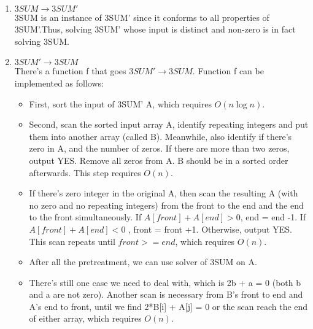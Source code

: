 \begin{problem}{1} ~
\begin{enumerate}
\item $3SUM \rightarrow 3SUM'$\\
3SUM is an instance of 3SUM' since it conforms to all properties of 3SUM'.Thus, solving 3SUM' whose input is distinct and non-zero is in fact solving 3SUM.\\

\item $3SUM' \rightarrow 3SUM$\\
There's a function f that goes $3SUM' \rightarrow 3SUM$. Function f can be implemented as follows:
\begin{itemize}
\item First, sort the input of 3SUM' A, which requires $O(n\log{}n)$.

\item Second, scan the sorted input array A, identify repeating integers and put them into another array (called B). Meanwhile, also identify if there's zero in A, and the number of zeros. If there are more than two zeros, output YES. Remove all zeros from A. B should be in a sorted order afterwards. This step requires $O(n)$.

\item If there's zero integer in the original A, then scan the resulting A (with no zero and no repeating integers) from the front to the end and the end to the front simultaneously. If $A[front] + A[end] > 0$, end = end -1. If $A[front] + A[end] < 0$ , front = front +1. Otherwise, output YES. This scan repeats until $front >= end$, which requires $O(n)$.

\item After all the pretreatment, we can use solver of 3SUM on A.

\item There's still one case we need to deal with, which is 2b + a = 0 (both b and a are not zero). Another scan is necessary from B's front to end and A's end to front, until we find 2*B[i] + A[j] = 0 or the scan reach the end of either array, which requires $O(n)$.
\end{itemize}

\end{enumerate}
\end{problem}
